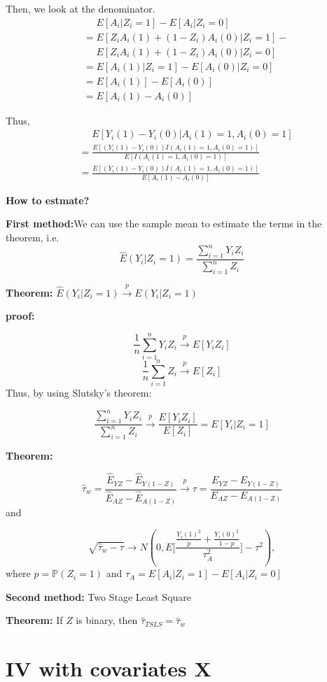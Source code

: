 \documentclass[
]{book}
\begin{document}
Then, we look at the denominator.
\begin{align*}
&\,\,\,\,\,\,\,\,E[A_i |Z_i=1] - E[A_i|Z_i=0]\\
&= E[Z_iA_i(1)+(1-Z_i)A_i(0)|Z_i=1] -\\
&\,\,\,\,\,\,\,\,E[Z_iA_i(1)+(1-Z_i)A_i(0)|Z_i=0]\\
&= E[A_i(1) |Z_i=1] - E[A_i(0)|Z_i=0]\\
&= E[A_i(1) ] - E[A_i(0)] \\
&= E[A_i(1)  - A_i(0)]
\end{align*}

Thus,
\begin{align*}
&\,\,\,\,\,\,\,\,E[Y_i(1) - Y_i(0) | A_i(1)=1, A_i(0)=1] \\
&= \frac{E[(Y_i(1) - Y_i(0))I(A_i(1)=1, A_i(0)=1)]}{E[I(A_i(1)=1, A_i(0)=1)]} \\
&= \frac{E[(Y_i(1) - Y_i(0))I(A_i(1)=1, A_i(0)=1)]}{E[A_i(1) - A_i(0)]}
\end{align*}

\textbf{How to estmate?}

\textbf{First method:}We can use the sample mean to estimate the terms in the theorem, i.e.
\[\hat E(Y_i |Z_i=1) = \frac{\sum_{i=1}^{n}Y_iZ_i}{\sum_{i=1}^{n}Z_i} \]

\textbf{Theorem: } \(\hat E(Y_i |Z_i=1) \overset{p}{\to} E(Y_i |Z_i=1)\)

\textbf{proof:}

\[\frac{1}{n}\sum_{i=1}^{n}Y_iZ_i \overset{p}{\to} E[Y_iZ_i]\]
\[\frac{1}{n}\sum_{i=1}^{n}Z_i \overset{p}{\to} E[Z_i]\]
Thus, by using Slutsky's theorem:

\[\frac{\sum_{i=1}^{n}Y_iZ_i}{\sum_{i=1}^{n}Z_i} \overset{p}{\to} \frac{E[Y_iZ_i]}{E[Z_i]} = E[Y_i|Z_i=1]\]

\textbf{Theorem:}

\[\hat{\tau}_w = \frac{\hat{E}_{YZ}-\hat{E}_{Y(1-Z)}}{\hat{E}_{AZ}-\hat{E}_{A(1-Z)}} \overset{p}{\to} \tau = \frac{{E}_{YZ}-{E}_{Y(1-Z)}}{{E}_{AZ}-{E}_{A(1-Z)}}\]
and

\[\sqrt{\hat{\tau}_w - \tau} \to N(0, E\bigg[ \frac{\frac{Y_i(1)^2}{p}+\frac{Y_i(0)^2}{1-p}}{\tau_A^2} \bigg] - \tau^2),\]
where \(p = \mathbb{P}(Z_i=1)\) and \(\tau_A = E[A_i |Z_i=1]-E[A_i |Z_i=0]\)

\textbf{Second method:} Two Stage Least Square

\textbf{Theorem:} If \(Z\) is binary, then \(\hat{\tau}_{TSLS} = \hat{\tau}_w\)

\hypertarget{iv-with-covariates-x}{%
\section{IV with covariates X}\label{iv-with-covariates-x}}
\end{document}
